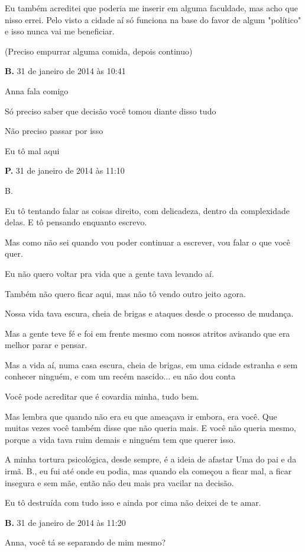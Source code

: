 Eu também acreditei que poderia me inserir em alguma faculdade, mas acho
que nisso errei. Pelo visto a cidade aí só funciona na base do favor de
algum "político" e isso nunca vai me beneficiar.

(Preciso empurrar alguma comida, depois continuo)

\textbf{B.} 31 de janeiro de 2014 às 10:41

Anna fala comigo

Só preciso saber que decisão você tomou diante disso tudo

Não preciso passar por isso

Eu tô mal aqui

\textbf{P.} 31 de janeiro de 2014 às 11:10

B.

Eu tô tentando falar as coisas direito, com delicadeza, dentro da
complexidade delas. E tô pensando enquanto escrevo.

Mas como não sei quando vou poder continuar a escrever, vou falar o que
você quer.

Eu não quero voltar pra vida que a gente tava levando aí.

Também não quero ficar aqui, mas não tô vendo outro jeito agora.

Nossa vida tava escura, cheia de brigas e ataques desde o processo de
mudança.

Mas a gente teve fé e foi em frente mesmo com nossos atritos avisando
que era melhor parar e pensar.

Mas a vida aí, numa casa escura, cheia de brigas, em uma cidade estranha
e sem conhecer ninguém, e com um recém nascido... eu não dou conta

Você pode acreditar que é covardia minha, tudo bem.

Mas lembra que quando não era eu que ameaçava ir embora, era você. Que
muitas vezes você também disse que não queria mais. E você não queria
mesmo, porque a vida tava ruim demais e ninguém tem que querer isso.

A minha tortura psicológica, desde sempre, é a ideia de afastar Uma do
pai e da irmã. B., eu fui até onde eu podia, mas quando ela começou a
ficar mal, a ficar insegura e sem mãe, então não deu mais pra vacilar na
decisão.

Eu tô destruída com tudo isso e ainda por cima não deixei de te amar.

\textbf{B.} 31 de janeiro de 2014 às 11:20

Anna, você tá se separando de mim mesmo?

